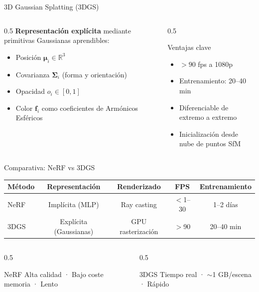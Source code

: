 \begin{frame}{3D Gaussian Splatting (3DGS)}
  \begin{columns}
    \begin{column}{0.5\textwidth}
      \textbf{Representación explícita} mediante primitivas Gaussianas aprendibles:
      \vspace{0.5em}
      \begin{itemize}
        \item Posición $\boldsymbol{\mu}_i \in \mathbb{R}^3$
        \item Covarianza $\boldsymbol{\Sigma}_i$ (forma y orientación)
        \item Opacidad $o_i \in [0,1]$
        \item Color $\mathbf{f}_i$ como coeficientes de Armónicos Esféricos
      \end{itemize}
    \end{column}
    \begin{column}{0.5\textwidth}
      \begin{exampleblock}{Ventajas clave}
        \begin{itemize}
          \item $> 90$ fps a 1080p
          \item Entrenamiento: 20--40 min
          \item Diferenciable de extremo a extremo
          \item Inicialización desde nube de puntos SfM
        \end{itemize}
      \end{exampleblock}
    \end{column}
  \end{columns}
\end{frame}

\begin{frame}{Comparativa: NeRF vs 3DGS}
  \centering
  \begin{tabular}{lcccc}
    \toprule
    \textbf{Método} & \textbf{Representación} & \textbf{Renderizado} & \textbf{FPS} & \textbf{Entrenamiento} \\
    \midrule
    NeRF  & Implícita (MLP) & Ray casting & $<$1--30  & 1--2 días \\
    3DGS  & Explícita (Gaussianas) & GPU rasterización & $>$90 & 20--40 min \\
    \bottomrule
  \end{tabular}
  \vspace{1em}

  \begin{columns}
    \begin{column}{0.5\textwidth}
      \begin{alertblock}{NeRF}
        Alta calidad · Bajo coste memoria · Lento
      \end{alertblock}
    \end{column}
    \begin{column}{0.5\textwidth}
      \begin{exampleblock}{3DGS}
        Tiempo real · $\sim$1 GB/escena · Rápido
      \end{exampleblock}
    \end{column}
  \end{columns}
\end{frame}
